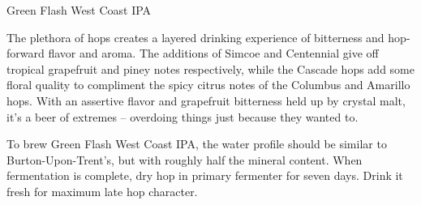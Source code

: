 \begin{recipie}{Green Flash West Coast IPA}

\begin{aboutblock}
The plethora of hops creates a layered drinking experience of bitterness and
hop-forward flavor and aroma. The additions of Simcoe and Centennial give off
tropical grapefruit and piney notes respectively, while the Cascade hops add some
floral quality to compliment the spicy citrus notes of the Columbus and Amarillo
hops. With an assertive flavor and grapefruit bitterness held up by crystal malt,
it's a beer of extremes -- overdoing things just because they wanted to.
\end{aboutblock}


\begin{methodandtiming}
 
\begin{mashsteps}
\end{mashsteps}

\begin{fermentationsteps}
\end{fermentationsteps}

\begin{directions}
To brew Green Flash West Coast IPA, the water profile should be similar to
Burton-Upon-Trent's, but with roughly half the mineral content. When fermentation
is complete, dry hop in primary fermenter for seven days. Drink it fresh for
maximum late hop character.
\end{directions}

\end{methodandtiming}

\pagebreak

\begin{ingredientsblock}

\begin{malts}
\end{malts}


\end{ingredientsblock}
\end{recipie}
